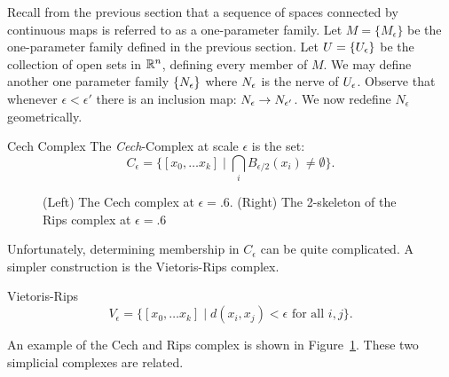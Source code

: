 Recall from the previous section that a sequence of spaces connected by continuous maps is referred to as a one-parameter family. Let $M = \{M_\epsilon\}$ be the one-parameter family defined in the previous section. Let $U = \{U_\epsilon\}$ be the collection of open sets in $\mathbb{R}^n$, defining every member of $M$. We may define another one parameter family $\{ N_\epsilon \}$ where $N_\epsilon$ is the nerve of $U_\epsilon$. Observe that whenever $\epsilon < \epsilon'$ there is an inclusion map: $N_\epsilon \rightarrow N_{\epsilon'}$.
We now redefine $N_{\epsilon}$ geometrically.
\begin{definition}{Cech Complex}
The \emph{Cech}-Complex at scale $\epsilon$ is the set:
\[ C_\epsilon = \{ [ x_0, \ldots x_k] \mid \bigcap_i B_{\epsilon/2}(x_i)  \neq \emptyset \}. \]
\end{definition}
\begin{figure}
\centering
 \hspace{1cm}
\caption{(Left) The Cech complex at $\epsilon = .6$. (Right) The 2-skeleton of the Rips complex at $\epsilon = .6$ }
\label{fig:c-and-r}
\end{figure}
Unfortunately, determining membership in $C_\epsilon$ can be quite complicated. A simpler construction is the 
Vietoris-Rips complex.
\begin{definition}{Vietoris-Rips}
\[ V_\epsilon = \{ [x_0, \ldots x_k] \mid d(x_i, x_j) < \epsilon \textrm{ for all } i,j  \}. \]
\end{definition}
An example of the Cech and Rips complex is shown in Figure~\ref{fig:c-and-r}. These two simplicial complexes are related.
